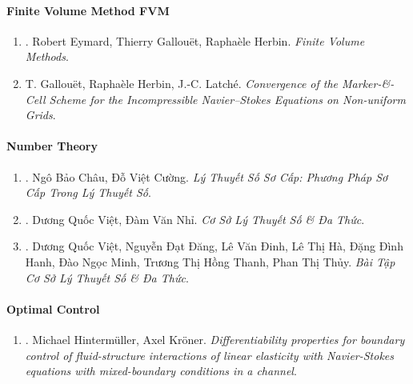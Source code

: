 \documentclass{article}
\begin{document}
\paragraph{Finite Volume Method FVM}

\begin{enumerate}
	\item \cite{Eymard_Gallouet_Herbin2019}. Robert Eymard, Thierry Gallou\"et, Rapha\`ele Herbin. {\it Finite Volume Methods}.\hfill{\sf[reading]}
	
	\item T. Gallou\"et, Rapha\`ele Herbin, J.-C. Latch\'e. {\it Convergence of the Marker-\&-Cell Scheme for the Incompressible Navier--Stokes Equations on Non-uniform Grids}.\hfill{\sf[reading]}
\end{enumerate}

\paragraph{Number Theory}

\begin{enumerate}
	\item \cite{Chau_Cuong_basic_number_theory}. {\sc Ngô Bảo Châu, Đỗ Việt Cường}. {\it Lý Thuyết Số Sơ Cấp: Phương Pháp Sơ Cấp Trong Lý Thuyết Số}.\hfill{\sf[reading]}
	
	\item \cite{Viet_Nhi_number_theory_polynomial}. Dương Quốc Việt, Đàm Văn Nhỉ. {\it Cơ Sở Lý Thuyết Số \& Đa Thức}.\hfill{\sf[reading]}
	
	\item \cite{Viet_Dang_Dinh_Ha_Hanh_Minh_Thanh_Thuy2022}. Dương Quốc Việt, Nguyễn Đạt Đăng, Lê Văn Đinh, Lê Thị Hà, Đặng Đình Hanh, Đào Ngọc Minh, Trương Thị Hồng Thanh, Phan Thị Thủy. {\it Bài Tập Cơ Sở Lý Thuyết Số \& Đa Thức}.\hfill{\sf[reading]}
\end{enumerate}

\paragraph{Optimal Control}

\begin{enumerate}
	\item \cite{Hintermueller_Kroener2023}. Michael Hinterm\"uller, Axel Kr\"oner. {\it Differentiability properties for boundary control of fluid-structure interactions of linear elasticity with Navier-Stokes equations with mixed-boundary conditions in a channel}.\hfill{\sf[done]}
\end{enumerate}
\end{document}
